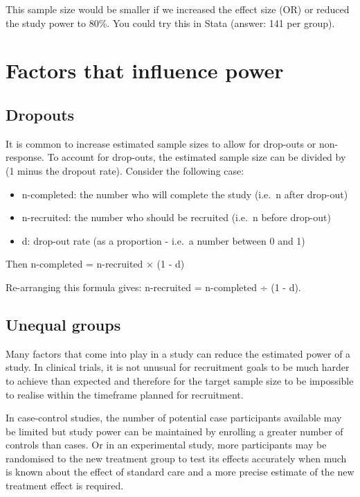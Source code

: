 \documentclass[
]{memoir}
\providecommand{\tightlist}{%
  \setlength{\itemsep}{0pt}\setlength{\parskip}{0pt}}
\begin{document}
This sample size would be smaller if we increased the effect size (OR) or reduced the study power to 80\%. You could try this in Stata (answer: 141 per group).

\hypertarget{factors-that-influence-power}{%
\section{Factors that influence power}\label{factors-that-influence-power}}

\hypertarget{dropouts}{%
\subsection{Dropouts}\label{dropouts}}

It is common to increase estimated sample sizes to allow for drop-outs or non-response. To account for drop-outs, the estimated sample size can be divided by (1 minus the dropout rate). Consider the following case:

\begin{itemize}
\tightlist
\item
  n-completed: the number who will complete the study (i.e.~n after drop-out)
\item
  n-recruited: the number who should be recruited (i.e.~n before drop-out)
\item
  d: drop-out rate (as a proportion - i.e.~a number between 0 and 1)
\end{itemize}

Then n-completed = n-recruited × (1 - d)

Re-arranging this formula gives: n-recruited = n-completed ÷ (1 - d).

\hypertarget{unequal-groups}{%
\subsection{Unequal groups}\label{unequal-groups}}

Many factors that come into play in a study can reduce the estimated power of a study. In clinical trials, it is not unusual for recruitment goals to be much harder to achieve than expected and therefore for the target sample size to be impossible to realise within the timeframe planned for recruitment.

In case-control studies, the number of potential case participants available may be limited but study power can be maintained by enrolling a greater number of controls than cases. Or in an experimental study, more participants may be randomised to the new treatment group to test its effects accurately when much is known about the effect of standard care and a more precise estimate of the new treatment effect is required.
\end{document}
